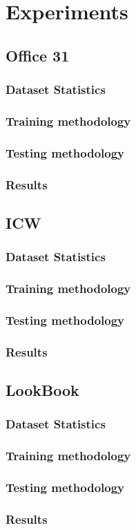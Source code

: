 \documentclass[../main.tex]{subfiles}
\begin{document}
    \chapter{Experiments}

    \section{Office 31}
    \subsection{Dataset Statistics}
    \subsection{Training methodology}
    \subsection{Testing methodology}
    \subsection{Results}

    \section{ICW}
    \subsection{Dataset Statistics}
    \subsection{Training methodology}
    \subsection{Testing methodology}
    \subsection{Results}

    \section{LookBook}
    \subsection{Dataset Statistics}
    \subsection{Training methodology}
    \subsection{Testing methodology}
    \subsection{Results}
\end{document}
